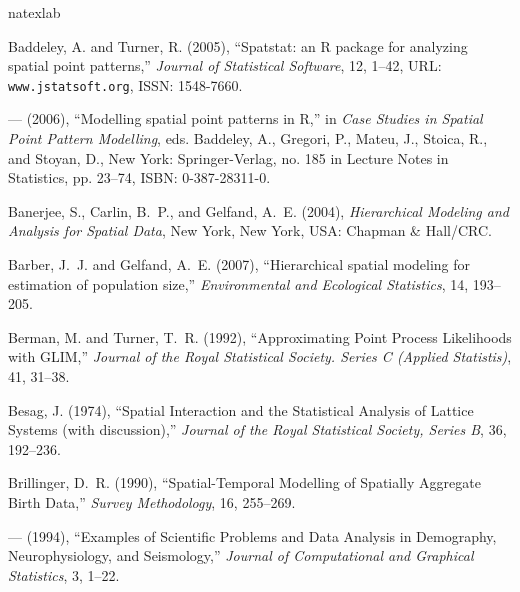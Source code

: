 \documentclass[12pt, titlepage]{article}\usepackage[]{graphicx}\usepackage[]{color}
\begin{document}
\clearpage

\begin{thebibliography}{47}
\newcommand{\enquote}[1]{``#1''}
\expandafter\ifx\csname natexlab\endcsname\relax\def\natexlab#1{#1}\fi

Baddeley, A. and Turner, R. (2005), \enquote{Spatstat: an {{\sf R}} package for
  analyzing spatial point patterns,} \textit{Journal of Statistical Software},
  12, 1--42, {URL}: {{\tt www.jstatsoft.org}}, {ISSN}: 1548-7660.

--- (2006), \enquote{Modelling spatial point patterns in {{\sf R}},} in
  \textit{Case Studies in Spatial Point Pattern Modelling}, eds. Baddeley, A.,
  Gregori, P., Mateu, J., Stoica, R., and Stoyan, D., New York:
  Springer-Verlag, no. 185 in Lecture Notes in Statistics, pp. 23--74, {ISBN}:
  0-387-28311-0.

Banerjee, S., Carlin, B.~P., and Gelfand, A.~E. (2004), \textit{Hierarchical
  Modeling and Analysis for Spatial Data}, New York, New York, USA: Chapman \&
  Hall/CRC.

Barber, J.~J. and Gelfand, A.~E. (2007), \enquote{Hierarchical spatial modeling
  for estimation of population size,} \textit{Environmental and Ecological
  Statistics}, 14, 193--205.

Berman, M. and Turner, T.~R. (1992), \enquote{Approximating Point Process
  Likelihoods with GLIM,} \textit{Journal of the Royal Statistical Society.
  Series C (Applied Statistis)}, 41, 31--38.

Besag, J. (1974), \enquote{Spatial Interaction and the Statistical Analysis of
  Lattice Systems (with discussion),} \textit{Journal of the Royal Statistical
  Society, Series B}, 36, 192--236.

Brillinger, D.~R. (1990), \enquote{Spatial-Temporal Modelling of Spatially
  Aggregate Birth Data,} \textit{Survey Methodology}, 16, 255--269.

--- (1994), \enquote{Examples of Scientific Problems and Data Analysis in
  Demography, Neurophysiology, and Seismology,} \textit{Journal of
  Computational and Graphical Statistics}, 3, 1--22.


\end{thebibliography}
\end{document}
